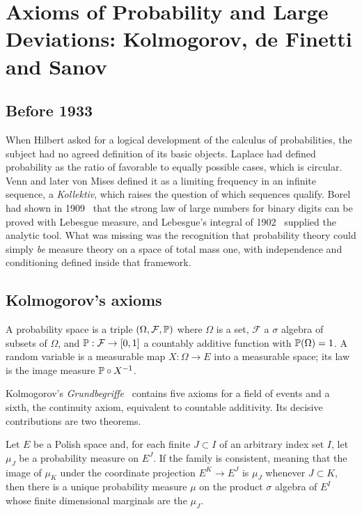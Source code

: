 \chapter[Axioms of Probability and Large Deviations]{Axioms of Probability and Large Deviations: Kolmogorov, de Finetti and Sanov}
\label{ch:axioms}

\section{Before 1933}

When Hilbert asked for a logical development of the calculus of probabilities, the subject had no agreed definition of its basic objects. Laplace had defined probability as the ratio of favorable to equally possible cases, which is circular. Venn and later von Mises defined it as a limiting frequency in an infinite sequence, a \emph{Kollektiv}, which raises the question of which sequences qualify. Borel had shown in 1909~\cite{borel1909} that the strong law of large numbers for binary digits can be proved with Lebesgue measure, and Lebesgue's integral of 1902~\cite{lebesgue1902} supplied the analytic tool. What was missing was the recognition that probability theory could simply \emph{be} measure theory on a space of total mass one, with independence and conditioning defined inside that framework.

\section{Kolmogorov's axioms}

\begin{definition}
A probability space is a triple $(\Omega,\mathcal{F},\P)$ where $\Omega$ is a set, $\mathcal{F}$ a $\sigma$ algebra of subsets of $\Omega$, and $\P:\mathcal{F}\to[0,1]$ a countably additive function with $\P(\Omega)=1$. A random variable is a measurable map $X:\Omega\to E$ into a measurable space; its law is the image measure $\P\circ X^{-1}$.
\end{definition}

Kolmogorov's \emph{Grundbegriffe}~\cite{kolmogorov1933} contains five axioms for a field of events and a sixth, the continuity axiom, equivalent to countable additivity. Its decisive contributions are two theorems.

\begin{theorem}
\label{thm:kolmogorov_extension}
Let $E$ be a Polish space and, for each finite $J\subset I$ of an arbitrary index set $I$, let $\mu_J$ be a probability measure on $E^J$. If the family is consistent, meaning that the image of $\mu_K$ under the coordinate projection $E^K\to E^J$ is $\mu_J$ whenever $J\subset K$, then there is a unique probability measure $\mu$ on the product $\sigma$ algebra of $E^I$ whose finite dimensional marginals are the $\mu_J$.
\end{theorem}

